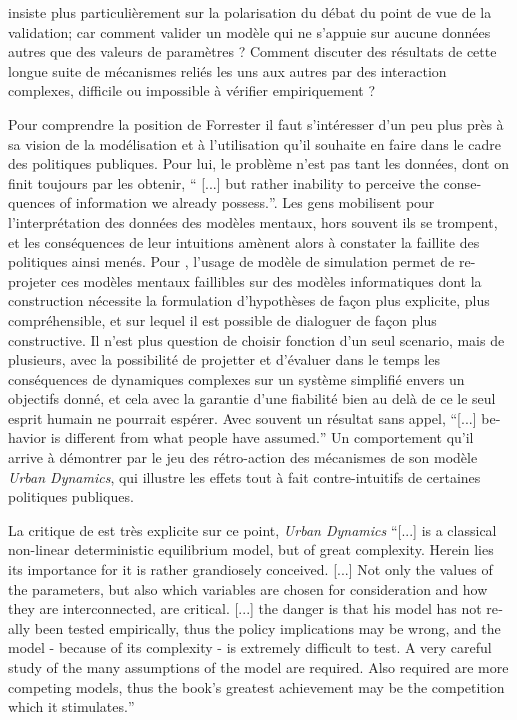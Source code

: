 \autocite{Batty2001} insiste plus particulièrement sur la polarisation du débat du point de vue de la validation; car comment valider un modèle qui ne s'appuie sur aucune données autres que des valeurs de paramètres ? Comment discuter des résultats de cette longue suite de mécanismes reliés les uns aux autres par des interaction complexes, difficile ou impossible à vérifier empiriquement ?

Pour comprendre la position de Forrester il faut s'intéresser d'un peu plus près à sa vision de la modélisation et à l'utilisation qu'il souhaite en faire dans le cadre des politiques publiques. Pour lui, le problème n'est pas tant les données, dont on finit toujours par les obtenir, \foreignquote{english}{ [...] but rather inability to perceive the consequences of information we already possess.}. Les gens mobilisent pour l'interprétation des données des modèles mentaux, hors souvent ils se trompent, et les conséquences de leur intuitions amènent alors à constater la faillite des politiques ainsi menés. Pour \textcite{Forrester1971}, l'usage de modèle de simulation permet de re-projeter ces modèles mentaux faillibles sur des modèles informatiques dont la construction nécessite la formulation d'hypothèses de façon plus explicite, plus compréhensible, et sur lequel il est possible de dialoguer de façon plus constructive. Il n'est plus question de choisir fonction d'un seul scenario, mais de plusieurs, avec la possibilité de projetter et d'évaluer dans le temps les conséquences de dynamiques complexes sur un système simplifié envers un objectifs donné, et cela avec la garantie d'une fiabilité bien au delà de ce le seul esprit humain ne pourrait espérer. Avec souvent un résultat sans appel, \foreignquote{english}{[...] behavior is different from what people have assumed.} Un comportement qu'il arrive à démontrer par le jeu des rétro-action des mécanismes de son modèle \textit{Urban Dynamics}, qui illustre les effets tout à fait contre-intuitifs de certaines politiques publiques.

La critique de \textcite{Tobler1970a} est très explicite sur ce point, \textit{Urban Dynamics} \foreignquote{english}{[...] is a classical non-linear deterministic equilibrium model, but of great complexity. Herein lies its importance for it is rather grandiosely conceived. [...] Not only the values of the parameters, but also which variables are chosen for consideration and how they are interconnected, are critical. [...] the danger is that his model has not really been tested empirically, thus the policy implications may be wrong, and the model - because of its complexity - is extremely difficult to test. A very careful study of the many assumptions of the model are required. Also required are more competing models, thus the book’s greatest achievement may be the competition which it stimulates.} 

